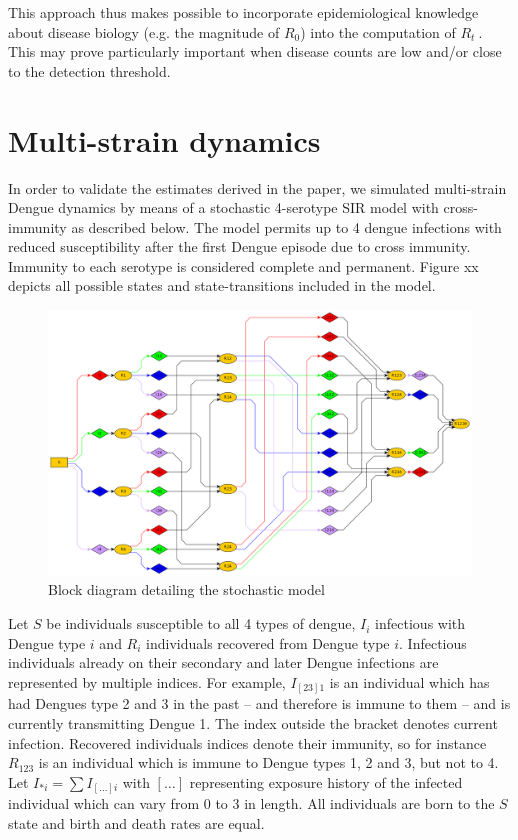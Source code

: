 \documentclass[12pt]{article}
\def \rr {$R_{t}\ $}
\begin{document}
This approach thus makes possible to incorporate epidemiological knowledge 
about disease biology (e.g. the magnitude of $R_0$) into the computation of \rr.
This may prove particularly important when disease counts are low and/or close 
to the detection threshold.
\newpage
\section*{Multi-strain dynamics}

In order to validate the estimates derived in the paper, we simulated 
multi-strain Dengue dynamics by means of a stochastic 4-serotype SIR model with 
cross-immunity as described below. 
The model permits up to 4 dengue infections 
with reduced susceptibility after the first Dengue episode due to cross 
immunity. 
Immunity to each serotype is considered complete and permanent. 
Figure xx depicts all possible states and state-transitions included in the 
model.

          \begin{figure}
 \centering
 \includegraphics[width=16cm]{Dengue4.png}

 \caption{Block diagram detailing the stochastic model}
 \label{fig:sde_blocks}
\end{figure}


Let $S$ be individuals susceptible to all 4 types of dengue, $I_i$ infectious 
with Dengue type $i$ and $R_i$ individuals recovered from Dengue type $i$. 
Infectious individuals already on their secondary and later Dengue infections 
are represented by multiple indices. For example, $I_{[23]1}$ is an individual 
which has had Dengues type 2 and 3 in the past -- and therefore is immune to 
them -- and is currently transmitting Dengue 1. 
The index outside the bracket 
denotes current infection. Recovered individuals indices denote their immunity, 
so for instance $R_{123}$ is an individual which is immune to Dengue types 1, 2 
and 3, but not to 4. Let $I_{*i} = \sum I_{[\ldots]i}$ with $[\ldots]$ 
representing exposure history of the infected individual which can vary from 0 
to 3 in length. 
All individuals are born to the $S$ state and birth and death 
rates are equal.
\end{document}
